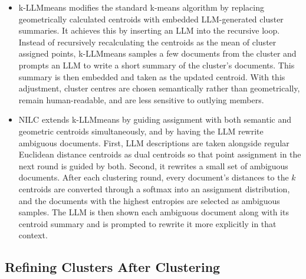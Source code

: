 \documentclass[11pt,a4paper,oneside]{report}
\begin{document}
\begin{itemize}
\item k-LLMmeans \citep{diazrodriguez2026kllmmeans} modifies the standard k-means algorithm by replacing geometrically calculated centroids with embedded LLM-generated cluster summaries. It achieves this by inserting an LLM into the recursive loop. Instead of recursively recalculating the centroids as the mean of cluster assigned points, k-LLMmeans samples a few documents from the cluster and prompts an LLM to write a short summary of the cluster's documents. This summary is then embedded and taken as the updated centroid. With this adjustment, cluster centres are chosen semantically rather than geometrically, remain human-readable, and are less sensitive to outlying members.
\item NILC \citep{wang2025nilc} extends k-LLMmeans by guiding assignment with both semantic and geometric centroids simultaneously, and by having the LLM rewrite ambiguous documents. First, LLM descriptions are taken alongside regular Euclidean distance centroids as dual centroids so that point assignment in the next round is guided by both. Second, it rewrites a small set of ambiguous documents. After each clustering round, every document's distances to the $k$ centroids are converted through a softmax into an assignment distribution, and the documents with the highest entropies are selected as ambiguous samples. The LLM is then shown each ambiguous document along with its centroid summary and is prompted to rewrite it more explicitly in that context.
\end{itemize}

\subsection{Refining Clusters After Clustering}\label{sec:after}
\end{document}
